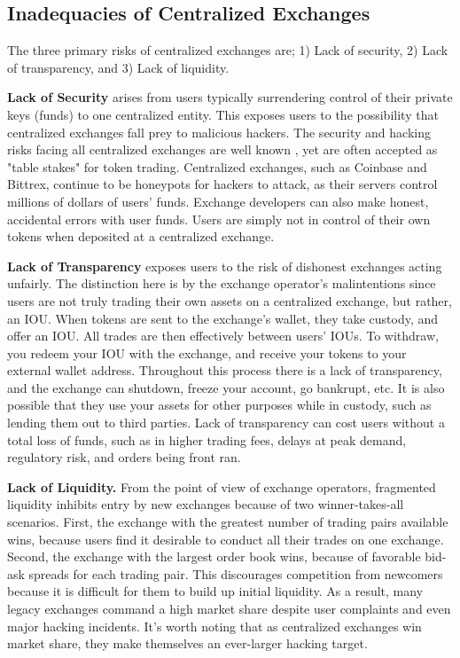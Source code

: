 \documentclass[UTF8,nofonts]{article}
\begin{document}
\begin{multicols}{2}
\subsection{Inadequacies of Centralized Exchanges}
The three primary risks of centralized exchanges are; 1) Lack of security, 2) Lack of transparency, and 3) Lack of liquidity.

\textbf{Lack of Security} arises from users typically surrendering control of their private keys (funds) to one centralized entity. This exposes users to the possibility that centralized exchanges fall prey to malicious hackers. The security and hacking risks facing all centralized exchanges are well known \cite{coincheckhack} \cite{mtgox} \cite{mcmillan2014inside}, yet are often accepted as "table stakes" for token trading. Centralized exchanges, such as Coinbase and Bittrex, continue to be honeypots for hackers to attack, as their servers control millions of dollars of users' funds. Exchange developers can also make honest, accidental errors with user funds. Users are simply not in control of their own tokens when deposited at a centralized exchange.

\textbf{Lack of Transparency} exposes users to the risk of dishonest exchanges acting unfairly. The distinction here is by the exchange operator's malintentions since users are not truly trading their own assets on a centralized exchange, but rather, an IOU. When tokens are sent to the exchange's wallet, they take custody, and offer an IOU. All trades are then effectively between users' IOUs. To withdraw, you redeem your IOU with the exchange, and receive your tokens to your external wallet address. Throughout this process there is a lack of transparency, and the exchange can shutdown, freeze your account, go bankrupt, etc. It is also possible that they use your assets for other purposes while in custody, such as lending them out to third parties. Lack of transparency can cost users without a total loss of funds, such as in higher trading fees, delays at peak demand, regulatory risk, and orders being front ran.

\textbf{Lack of Liquidity.} From the point of view of exchange operators, fragmented liquidity inhibits entry by new exchanges because of two winner-takes-all scenarios. First, the exchange with the greatest number of trading pairs available wins, because users find it desirable to conduct all their trades on one exchange. Second, the exchange with the largest order book wins, because of favorable bid-ask spreads for each trading pair. This discourages competition from newcomers because it is difficult for them to build up initial liquidity. As a result, many legacy exchanges command a high market share despite user complaints and even major hacking incidents. It's worth noting that as centralized exchanges win market share, they make themselves an ever-larger hacking target. 


\end{multicols}
\end{document}
